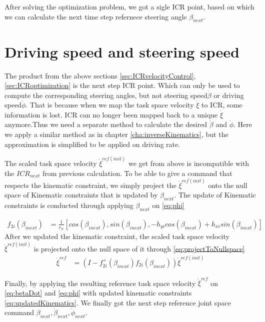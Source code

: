

After solving the optimization problem, we got a sigle ICR point, based on which we can calculate the next time step refernece steering angle $\beta_{next}$.


\section{Driving speed and steering speed}
The product from the above sections \cref{sec:ICRvelocityControl},\cref{sec:ICRoptimization} is the next step ICR point. Which can only be used to compute the corresponding steering angles, but not steering speed$\dot{\beta}$ or driving speed$\dot{\phi}$. That is because when we map the task space velocity $\dot{\xi}$ to ICR, some information is lost. ICR can no longer been mapped back to a unique $\dot{\xi}$ anymore.Thus we need a separate method to calculate the desired $\dot{\beta}$ and $\dot{\phi}$. Here we apply a similar method as in chapter \cref{cha:inverseKinematics}, but the approximation is simplified to be applied on driving rate. 















The scaled task space velocity $\dot{\xi}^{ref(init)}$ we get from above is incompatible with the $ICR_{next}$ from previous calculation. To be able to give a command that respects the kinematic constraint, we simply project the $\dot{\xi}^{ref(init)}$ onto the null space of Kinematic constraints that is updated by $\beta_{next}$. 
The update of Kinematic constraints is conducted through applying $\beta_{next}$ on \cref{eq:phi}

\begin{equation}\label{eq:updatedKinematics}
    \begin{split}
        f_{2i}(\beta_{inext}) &= \frac{1}{r_w}[cos(\beta_{inext}), sin(\beta_{inext}), -h_{yi}cos(\beta_{inext})+h_{xi}sin(\beta_{inext})]
    \end{split}
\end{equation}
After we updated the kinematic constraint, the scaled task space velocity $\dot{\xi}^{ref(init)}$ is projected onto the null space of it through \cref{eq:projectToNullspace}
\begin{equation}\label{eq:projectToNullspace}
    \begin{split}
       \dot{\xi}^{ref} &= (I-f_{2i}^{+}(\beta_{inext})f_{2i}(\beta_{inext}))\dot{\xi}^{ref(init)}
    \end{split}
\end{equation}

Finally, by applying the resulting reference task space velocity $\dot{\xi}^{ref}$ on \cref{eq:betaDot} and \cref{eq:phi} with updated kinematic constraints \cref{eq:updatedKinematics}. We finally got the next step reference joint space command $\beta_{next}, \dot{\beta}_{next}, \dot{\phi}_{next}$.